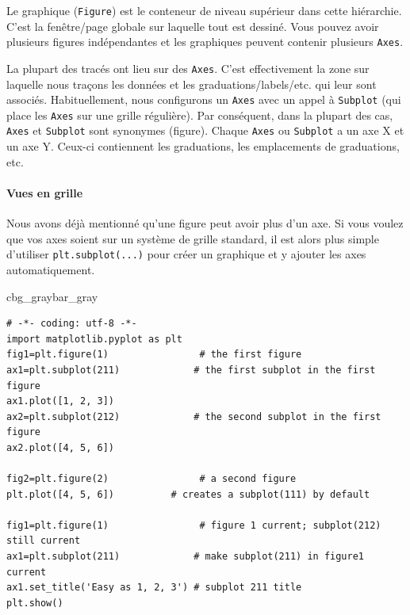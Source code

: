 \documentclass[%
oneside,                 %
final,                   %
10pt,french]{article}
\newenvironment{_pro_tight}[2]{
   \def\FrameCommand{\color{#2}\vrule width 1mm\normalcolor\colorbox{#1}}
   \FrameRule0.6pt\MakeFramed {\advance\hsize-2mm\FrameRestore}\vskip3mm}
   {\vskip0mm\endMakeFramed}
\newenvironment{pro}[2]{
\bgroup\rmfamily
\fboxsep=0mm\relax
\begin{_pro_tight}{#1}{#2}
\list{}{\parsep=-2mm\parskip=0mm\topsep=0pt\leftmargin=2mm
\rightmargin=2\leftmargin\leftmargin=4pt\relax}
\item\relax}
{\endlist\end{_pro_tight}\egroup}
\begin{document}
Le graphique (\texttt{Figure}) est le conteneur de niveau supérieur dans cette hiérarchie. C'est la fenêtre/page globale sur laquelle tout est dessiné.
Vous pouvez avoir plusieurs figures indépendantes et les graphiques peuvent contenir plusieurs \texttt{Axes}.

La plupart des tracés ont lieu sur des \texttt{Axes}. C’est effectivement la zone sur laquelle nous traçons les données et les graduations/labels/etc. qui leur sont associés. Habituellement, nous configurons un \texttt{Axes} avec un appel à \texttt{Subplot} (qui place les \texttt{Axes} sur une grille régulière). Par conséquent, dans la plupart des cas, \texttt{Axes} et \texttt{Subplot} sont synonymes (figure). Chaque \texttt{Axes} ou \texttt{Subplot} a un axe X et un axe Y. Ceux-ci contiennent les graduations, les emplacements de graduations, etc.

\paragraph{Vues en grille }
Nous avons déjà mentionné qu’une figure peut avoir plus d’un axe. Si vous voulez que vos axes soient sur un système de grille standard, il est alors plus simple d'utiliser \texttt{plt.subplot(...)} pour créer un graphique et y ajouter les axes automatiquement.
\begin{pro}{cbg_gray}{bar_gray}\begin{verbatim}
# -*- coding: utf-8 -*-
import matplotlib.pyplot as plt
fig1=plt.figure(1)                # the first figure
ax1=plt.subplot(211)             # the first subplot in the first figure
ax1.plot([1, 2, 3])
ax2=plt.subplot(212)             # the second subplot in the first figure
ax2.plot([4, 5, 6])

fig2=plt.figure(2)                # a second figure
plt.plot([4, 5, 6])          # creates a subplot(111) by default

fig1=plt.figure(1)                # figure 1 current; subplot(212) still current
ax1=plt.subplot(211)             # make subplot(211) in figure1 current
ax1.set_title('Easy as 1, 2, 3') # subplot 211 title
plt.show()
\end{verbatim}
\end{pro}
\noindent
\end{document}
